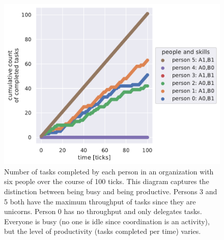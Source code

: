 \begin{figure}[H] %
\centering
\includegraphics[width=1\textwidth]{images/task_distribution_tasks_per_person_simCount1_skills2_levels1_taskduration1_people6_social0_ticks100.pdf}
\caption{Number of tasks completed by each person in an organization with six people over the course of 100 ticks. This diagram captures the distinction between being busy and being productive. Persons 3 and 5 both have the maximum throughput of tasks since they are unicorns. Person 0 has no throughput and only delegates tasks. Everyone is busy (no one is idle since coordination is an activity), but the level of productivity (tasks completed per time) varies.}
\label{fig:task-distribution-tasks-per-person}
\end{figure}




